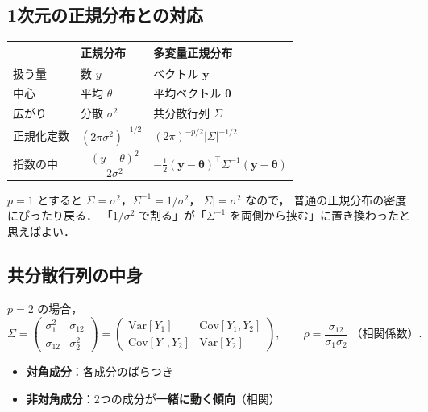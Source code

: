 \documentclass[lualatex,ja=standard,a4paper,12pt]{bxjsarticle}
\begin{document}
\subsection{1次元の正規分布との対応}

\begin{center}
\renewcommand{\arraystretch}{1.6}
\begin{tabular}{lll}
\toprule
 & 正規分布 & 多変量正規分布 \\
\midrule
扱う量 & 数 $y$ & ベクトル $\bm{y}$ \\
中心 & 平均 $\theta$ & 平均ベクトル $\bm{\theta}$ \\
広がり & 分散 $\sigma^2$ & 共分散行列 $\Sigma$ \\
正規化定数 & $(2\pi\sigma^2)^{-1/2}$ & $(2\pi)^{-p/2}|\Sigma|^{-1/2}$ \\
指数の中 & $-\dfrac{(y-\theta)^2}{2\sigma^2}$ & $-\tfrac12(\bm{y}-\bm{\theta})^\top\Sigma^{-1}(\bm{y}-\bm{\theta})$ \\
\bottomrule
\end{tabular}
\end{center}

\noindent $p = 1$ とすると $\Sigma = \sigma^2$，$\Sigma^{-1} = 1/\sigma^2$，$|\Sigma| = \sigma^2$ なので，
普通の正規分布の密度にぴったり戻る．
「$1/\sigma^2$ で割る」が「$\Sigma^{-1}$ を両側から挟む」に置き換わったと思えばよい．

\subsection{共分散行列の中身}

$p = 2$ の場合，
\[
  \Sigma = \begin{pmatrix}
    \sigma_1^2 & \sigma_{12} \\
    \sigma_{12} & \sigma_2^2
  \end{pmatrix}
  = \begin{pmatrix}
    \mathrm{Var}[Y_1] & \mathrm{Cov}[Y_1, Y_2] \\
    \mathrm{Cov}[Y_1, Y_2] & \mathrm{Var}[Y_2]
  \end{pmatrix},
  \qquad
  \rho = \frac{\sigma_{12}}{\sigma_1\sigma_2}\;\text{（相関係数）}.
\]
\begin{itemize}
  \item \textbf{対角成分}：各成分のばらつき
  \item \textbf{非対角成分}：2つの成分が\textbf{一緒に動く傾向}（相関）
\end{itemize}

\end{document}
